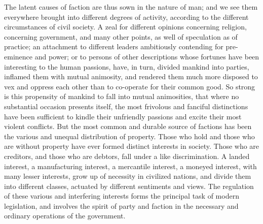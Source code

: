 The latent causes of faction are thus sown in the nature of man; and we see them everywhere brought into different degrees of activity, according to the different circumstances of civil society. 
A zeal for different opinions concerning religion, concerning government, and many other points, as well of speculation as of practice; an attachment to different leaders ambitiously contending for pre-eminence and power; or to persons of other descriptions whose fortunes have been interesting to the human passions, have, in turn, divided mankind into parties, inflamed them with mutual animosity, and rendered them much more disposed to vex and oppress each other than to co-operate for their common good. 
So strong is this propensity of mankind to fall into mutual animosities, that where no substantial occasion presents itself, the most frivolous and fanciful distinctions have been sufficient to kindle their unfriendly passions and excite their most violent conflicts. 
But the most common and durable source of factions has been the various and unequal distribution of property. 
Those who hold and those who are without property have ever formed distinct interests in society. 
Those who are creditors, and those who are debtors, fall under a like discrimination. 
A landed interest, a manufacturing interest, a mercantile interest, a moneyed interest, with many lesser interests, grow up of necessity in civilized nations, and divide them into different classes, actuated by different sentiments and views. 
The regulation of these various and interfering interests forms the principal task of modern legislation, and involves the spirit of party and faction in the necessary and ordinary operations of the government.

